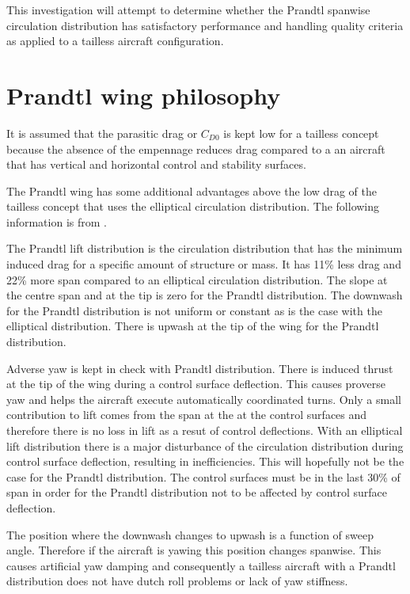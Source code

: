\documentclass{report}
\begin{document}
This investigation will attempt to determine whether the Prandtl spanwise circulation distribution has satisfactory performance and handling quality criteria as applied to a tailless aircraft configuration.

\section{Prandtl wing philosophy}

It is assumed that the parasitic drag or $C_{D0}$ is kept low for a tailless concept because the absence of the empennage reduces drag compared to a an aircraft that has vertical and horizontal control and stability surfaces.

The Prandtl wing has some additional advantages above the low drag of the tailless concept that uses the elliptical circulation distribution.  The following information is from \cite{omegataupodcastPrandtl}.

The Prandtl lift distribution is the circulation distribution that has the minimum induced drag for a specific amount of structure or mass.  It has 11\% less drag and 22\% more span compared to an elliptical circulation distribution.  The slope at the centre span and at the tip is zero for the Prandtl distribution.  The downwash for the Prandtl distribution is not uniform or constant as is the case with the elliptical distribution.  There is upwash at the tip of the wing for the Prandtl distribution.

Adverse yaw is kept in check with Prandtl distribution.  There is induced thrust at the tip of the wing during a control surface deflection.  This causes proverse yaw and helps the aircraft execute automatically coordinated turns.  Only a small contribution to lift comes from the span at the at the control surfaces and therefore there is no loss in lift as a resut of control deflections.  With an elliptical lift distribution there is a major disturbance of the circulation distribution during control surface deflection, resulting in inefficiencies.  This will hopefully not be the case for the Prandtl distribution.  The control surfaces must be in the last 30\% of span in order for the Prandtl distribution not to be affected by control surface deflection.

The position where the downwash changes to upwash is a function of sweep angle.  Therefore if the aircraft is yawing this position changes spanwise.  This causes artificial yaw damping and consequently a tailless aircraft with a Prandtl distribution does not have dutch roll problems or lack of yaw stiffness.
\end{document}

